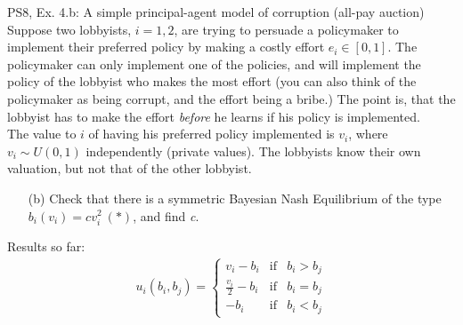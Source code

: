 \begin{frame}{PS8, Ex. 4.b: A simple principal-agent model of corruption (all-pay auction)}
    Suppose two lobbyists, $i = 1, 2$, are trying to persuade a policymaker to implement their preferred policy by making a costly effort $e_i\in[0, 1]$. The policymaker can only implement one of the policies, and will implement the policy of the lobbyist who makes the most effort (you can also think of the policymaker as being corrupt, and the effort being a bribe.) The point is, that the lobbyist has to make the effort \textit{before} he learns if his policy is implemented.\\\medskip
    The value to $i$ of having his preferred policy implemented is $v_i$, where $v_i\sim U(0, 1)$ independently (private values). The lobbyists know their own valuation, but not that of the other lobbyist.
    \begin{itemize}
      \item[(b)] Check that there is a symmetric Bayesian Nash Equilibrium of the type $b_i(v_i) = cv_i^2\ (*)$, and find \textit{c}.
    \end{itemize} \vspace{-8pt}
    \begin{multicols}{2}
      \vfill\null\columnbreak
      Results so far: \vspace{-6pt}
      \begin{align*}
        u_i(b_i,b_j)=\left\{\begin{array}{lcl}
          v_i-b_i           & \text{if} & b_i>b_j \\
          \frac{v_i}{2}-b_i & \text{if} & b_i=b_j \\
          -b_i              & \text{if} & b_i<b_j
        \end{array}\right.
      \end{align*}
      \vfill\null
    \end{multicols}
\end{frame}
